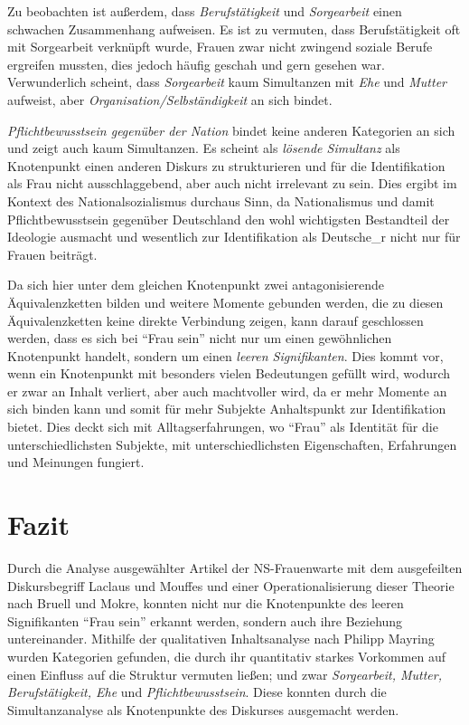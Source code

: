 \documentclass[12pt, titlepage=true, toc=bib]{scrartcl}
\begin{document}
{Zu beobachten ist außerdem, dass \textit{Berufstätigkeit} und \textit{Sorgearbeit} einen schwachen Zusammenhang aufweisen. Es ist zu vermuten, dass Berufstätigkeit oft mit Sorgearbeit verknüpft wurde, Frauen zwar nicht zwingend soziale Berufe ergreifen mussten, dies jedoch häufig geschah und gern gesehen war. Verwunderlich scheint, dass \textit{Sorgearbeit} kaum Simultanzen mit \textit{Ehe} und \textit{Mutter} aufweist, aber \textit{Organisation/Selbständigkeit} an sich bindet. 

\textit{Pflichtbewusstsein gegenüber der Nation} bindet keine anderen Kategorien an sich und zeigt auch kaum Simultanzen. Es scheint als \textit{lösende Simultanz} als Knotenpunkt einen anderen Diskurs zu strukturieren und für die Identifikation als Frau nicht ausschlaggebend, aber auch nicht irrelevant zu sein. Dies ergibt im Kontext des Nationalsozialismus durchaus Sinn, da Nationalismus und damit Pflichtbewusstsein gegenüber Deutschland den wohl wichtigsten Bestandteil der Ideologie ausmacht und wesentlich zur Identifikation als Deutsche\_r nicht nur für Frauen beiträgt.


Da sich hier unter dem gleichen Knotenpunkt zwei antagonisierende Äquivalenzketten bilden und weitere Momente gebunden werden, die zu diesen Äquivalenzketten keine direkte Verbindung zeigen, kann darauf geschlossen werden, dass es sich bei "`Frau sein"' nicht nur um einen gewöhnlichen Knotenpunkt handelt, sondern um einen \textit{leeren Signifikanten}. Dies kommt vor, wenn ein Knotenpunkt mit besonders vielen Bedeutungen gefüllt wird, wodurch er zwar an Inhalt verliert, aber auch machtvoller wird, da er mehr Momente an sich binden kann und somit für mehr Subjekte Anhaltspunkt zur Identifikation bietet. Dies deckt sich mit Alltagserfahrungen, wo "`Frau"' als Identität für die unterschiedlichsten Subjekte, mit unterschiedlichsten Eigenschaften, Erfahrungen und Meinungen fungiert.


\section{Fazit}

Durch die Analyse ausgewählter Artikel der NS-Frauenwarte mit dem ausgefeilten Diskursbegriff Laclaus und Mouffes und einer Operationalisierung dieser Theorie nach Bruell und Mokre, konnten nicht nur die Knotenpunkte des leeren Signifikanten "`Frau sein"' erkannt werden, sondern auch ihre Beziehung untereinander.  Mithilfe der qualitativen Inhaltsanalyse nach Philipp Mayring wurden Kategorien gefunden, die durch ihr quantitativ starkes Vorkommen auf einen Einfluss auf die Struktur vermuten ließen; und zwar \textit{Sorgearbeit, Mutter, Berufstätigkeit, Ehe} und \textit{Pflichtbewusstsein}. Diese konnten durch die Simultanzanalyse als Knotenpunkte des Diskurses ausgemacht werden. 

}
\end{document}
